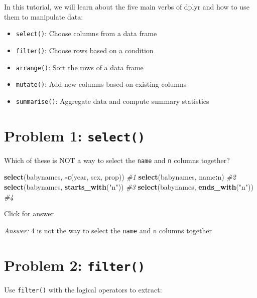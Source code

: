 \documentclass[
]{book}
\newenvironment{Shaded}{\begin{snugshade}}{\end{snugshade}}
\newcommand{\CommentTok}[1]{\textcolor[rgb]{0.56,0.35,0.01}{\textit{#1}}}
\newcommand{\FunctionTok}[1]{\textcolor[rgb]{0.13,0.29,0.53}{\textbf{#1}}}
\newcommand{\NormalTok}[1]{#1}
\newcommand{\SpecialCharTok}[1]{\textcolor[rgb]{0.81,0.36,0.00}{\textbf{#1}}}
\newcommand{\StringTok}[1]{\textcolor[rgb]{0.31,0.60,0.02}{#1}}
\providecommand{\tightlist}{%
  \setlength{\itemsep}{0pt}\setlength{\parskip}{0pt}}
\begin{document}
In this tutorial, we will learn about the five main verbs of dplyr and how to use them to manipulate data:

\begin{itemize}
\tightlist
\item
  \texttt{select()}: Choose columns from a data frame
\item
  \texttt{filter()}: Choose rows based on a condition
\item
  \texttt{arrange()}: Sort the rows of a data frame
\item
  \texttt{mutate()}: Add new columns based on existing columns
\item
  \texttt{summarise()}: Aggregate data and compute summary statistics
\end{itemize}

\hypertarget{problem-1-select}{%
\section{\texorpdfstring{Problem 1: \texttt{select()}}{Problem 1: select()}}\label{problem-1-select}}

Which of these is NOT a way to select the \texttt{name} and \texttt{n} columns together?

\begin{Shaded}
\begin{Highlighting}[]
\FunctionTok{select}\NormalTok{(babynames, }\SpecialCharTok{{-}}\FunctionTok{c}\NormalTok{(year, sex, prop))  }\CommentTok{\#1}
\FunctionTok{select}\NormalTok{(babynames, name}\SpecialCharTok{:}\NormalTok{n)   }\CommentTok{\#2}
\FunctionTok{select}\NormalTok{(babynames, }\FunctionTok{starts\_with}\NormalTok{(}\StringTok{"n"}\NormalTok{)) }\CommentTok{\#3}
\FunctionTok{select}\NormalTok{(babynames, }\FunctionTok{ends\_with}\NormalTok{(}\StringTok{"n"}\NormalTok{))  }\CommentTok{\#4}
\end{Highlighting}
\end{Shaded}

Click for answer

\emph{Answer:} 4 is not the way to select the \texttt{name} and \texttt{n} columns together

\hypertarget{problem-2-filter}{%
\section{\texorpdfstring{Problem 2: \texttt{filter()}}{Problem 2: filter()}}\label{problem-2-filter}}

Use \texttt{filter()} with the logical operators to extract:
\end{document}
